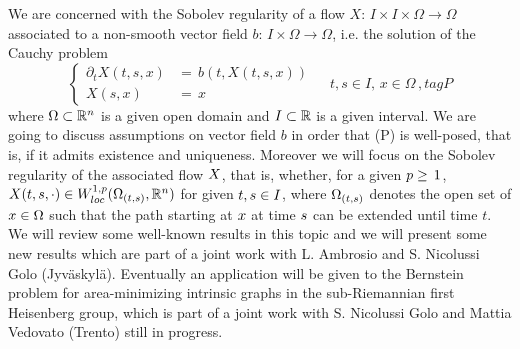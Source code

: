 \mypage
{}
\begin{myabstract}
We are concerned with the Sobolev regularity of a flow 
$X:\,I\times I\times \Omega\to\Omega$ 
associated to a non-smooth vector field 
$b:\,I\times\Omega\to\Omega$, 
i.e. the solution of the Cauchy problem
\[
\begin{cases}
\partial_tX(t,s,x)&=\,b(t,X(t,s,x))\\
X(s,x)&=\,x
\end{cases}
\quad\,t,s\in I, \,x\in\Omega\,,
tag{P}
\]
where $\Omega\subset\mathbb R^n\protect $ is a given open domain and $I\subset\mathbb R\protect $ is a  given  interval.
We are going  to discuss   assumptions on vector field 
$b$ in order that (P) is well-posed, that is, if it admits existence and uniqueness. Moreover we will focus  on the Sobolev regularity of the associated flow $X\protect $,    that is,  whether, for a given $p\ge\,1\protect $,   $X(t,s,\cdot)\in W_{loc}^{1,p}(\Omega_{(t,s)},\mathbb R^n)\protect $ for given $t,s\in I\protect $, where $\Omega_{(t,s)}\protect $ denotes the open set of $x\in\Omega\protect $ such that the path starting at $x\protect $ at time $s\protect $ can be extended until time $t$.  We will review some well-known results  in this topic and we will present some new results which  are part of a joint work with L. Ambrosio  and S. Nicolussi Golo (Jyväskylä). Eventually an application will be given to the Bernstein problem for area-minimizing intrinsic graphs in the sub-Riemannian first Heisenberg group, which is part of a joint work with S. Nicolussi Golo and Mattia Vedovato (Trento) still in progress.
\end{myabstract}

